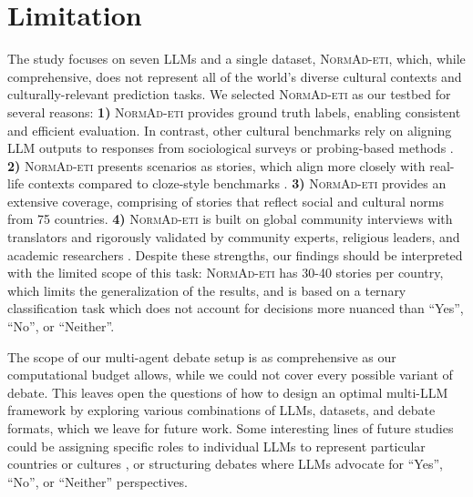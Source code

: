 \section{Limitation}

The study focuses on seven LLMs and a single dataset, \textsc{NormAd-eti}, which, while comprehensive, does not represent all of the world's diverse cultural contexts and culturally-relevant prediction tasks. We selected \textsc{NormAd-eti} as our testbed for several reasons: \textbf{1)} \textsc{NormAd-eti} provides ground truth labels, enabling consistent and efficient evaluation. In contrast, other cultural benchmarks rely on aligning LLM outputs to responses from sociological surveys \cite{arora-etal-2023-probing, masoud2024culturalalignmentlargelanguage, kharchenko2024llmsrepresentvaluescultures, selfalignment, investigating} or probing-based methods \cite{culturegen, choenni-etal-2024-echoes, culturalbench}. \textbf{2)} \textsc{NormAd-eti} presents scenarios as stories, which align more closely with real-life contexts compared to cloze-style benchmarks \cite{culturegen}. \textbf{3)} \textsc{NormAd-eti} provides an extensive coverage, comprising of stories that reflect social and cultural norms from 75 countries. \textbf{4)} \textsc{NormAd-eti} is built on global community interviews with translators and rigorously validated by community experts, religious leaders, and academic researchers \cite{normad}. 
Despite these strengths, our findings should be interpreted with the limited scope of this task: \textsc{NormAd-eti} has 30-40 stories per country, which limits the generalization of the results, and is based on a ternary classification task  which does not account for decisions more nuanced than ``Yes'', ``No'', or ``Neither''.




The scope of our multi-agent debate setup is as comprehensive as our computational budget allows, while we could not cover every possible variant of debate. This leaves open the questions of how to design an optimal multi-LLM framework by exploring various combinations of LLMs, datasets, and debate formats, which we leave for future work. Some interesting lines of future studies could be assigning specific roles to individual LLMs to represent particular countries or cultures \cite{culturepark}, or structuring debates where LLMs advocate for ``Yes'', ``No'', or ``Neither'' perspectives.

